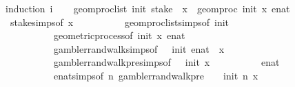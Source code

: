 \begin{isabellebody}
%
\isadelimproof
%
\endisadelimproof
%
\isatagproof
{}\isamarkupfalse%
{\isacharparenleft}{\kern0pt}induction\ i{\isacharparenright}{\kern0pt}\isanewline
\ \ \isamarkupfalse%
\ {\isachardoublequoteopen}geom{\isacharunderscore}{\kern0pt}proc{\isacharunderscore}{\kern0pt}list\ init\ {\isacharparenleft}{\kern0pt}stake\ {}\ x{\isacharparenright}{\kern0pt}\ {\isacharequal}{\kern0pt}\ geom{\isacharunderscore}{\kern0pt}proc\ init\ x\ {\isacharparenleft}{\kern0pt}enat\ {}{\isacharparenright}{\kern0pt}{\isachardoublequoteclose}\isanewline
\ \ \ \ \isamarkupfalse%
\ stake{\isachardot}{\kern0pt}simps{\isacharparenleft}{\kern0pt}{}{\isacharparenright}{\kern0pt}{\isacharbrackleft}{\kern0pt}of\ x{\isacharbrackright}{\kern0pt}\isanewline
\ \ \ \ \ \ \ \ \ \ geom{\isacharunderscore}{\kern0pt}proc{\isacharunderscore}{\kern0pt}list{\isachardot}{\kern0pt}simps{\isacharparenleft}{\kern0pt}{}{\isacharparenright}{\kern0pt}{\isacharbrackleft}{\kern0pt}of\ init{\isacharbrackright}{\kern0pt}\isanewline
\ \ \ \ \ \ \ \ \ \ geometric{\isacharunderscore}{\kern0pt}process{\isacharbrackleft}{\kern0pt}of\ init\ x\ {\isachardoublequoteopen}enat\ {}{\isachardoublequoteclose}{\isacharbrackright}{\kern0pt}\isanewline
\ \ \ \ \ \ \ \ \ \ gambler{\isacharunderscore}{\kern0pt}rand{\isacharunderscore}{\kern0pt}walk{\isachardot}{\kern0pt}simps{\isacharparenleft}{\kern0pt}{}{\isacharparenright}{\kern0pt}{\isacharbrackleft}{\kern0pt}of\ {}\ {\isachardoublequoteopen}{\isacharminus}{\kern0pt}{}{\isachardoublequoteclose}\ init\ {\isachardoublequoteopen}enat\ {}{\isachardoublequoteclose}\ x{\isacharbrackright}{\kern0pt}\isanewline
\ \ \ \ \ \ \ \ \ \ gambler{\isacharunderscore}{\kern0pt}rand{\isacharunderscore}{\kern0pt}walk{\isacharunderscore}{\kern0pt}pre{\isachardot}{\kern0pt}simps{\isacharparenleft}{\kern0pt}{}{\isacharparenright}{\kern0pt}{\isacharbrackleft}{\kern0pt}of\ {}\ {\isachardoublequoteopen}{\isacharminus}{\kern0pt}{}{\isachardoublequoteclose}\ init\ x{\isacharbrackright}{\kern0pt}\isanewline
\ \ \ \ \ \ \ \ \ \ enat{\isacharunderscore}{\kern0pt}{}\isanewline
\ \ \ \ \ \ \ \ \ \ enat{\isachardot}{\kern0pt}simps{\isacharparenleft}{\kern0pt}{}{\isacharparenright}{\kern0pt}{\isacharbrackleft}{\kern0pt}of\ {\isachardoublequoteopen}{\isasymlambda}n{\isachardot}{\kern0pt}\ gambler{\isacharunderscore}{\kern0pt}rand{\isacharunderscore}{\kern0pt}walk{\isacharunderscore}{\kern0pt}pre\ {}\ {\isacharparenleft}{\kern0pt}{\isacharminus}{\kern0pt}\ {}{\isacharparenright}{\kern0pt}\ init\ n\ x{\isachardoublequoteclose}\ {\isachardoublequoteopen}{\isacharminus}{\kern0pt}{}{\isachardoublequoteclose}\ {}{\isacharbrackright}{\kern0pt}\isanewline

\end{isabellebody}
